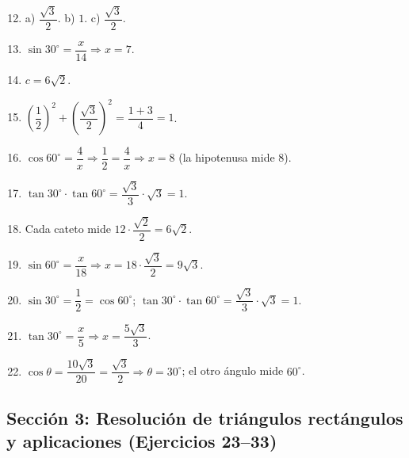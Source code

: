 \documentclass[12pt, letterpaper]{article}
\providecommand{\sen}{\sin}
\begin{document}
  \begin{enumerate}[leftmargin=*, label=\textbf{\arabic*.}]
    \setcounter{enumi}{11}
    \item a) $\dfrac{\sqrt{3}}{2}$. \quad b) $1$. \quad c) $\dfrac{\sqrt{3}}{2}$.
    \item $\sen 30^{\circ} = \dfrac{x}{14} \Rightarrow x = 7$.
    \item $c = 6\sqrt{2}$.
    \item $\left(\dfrac{1}{2}\right)^2 + \left(\dfrac{\sqrt{3}}{2}\right)^2 = \dfrac{1 + 3}{4} = 1$. \checkmark
    \item $\cos 60^{\circ} = \dfrac{4}{x} \Rightarrow \dfrac{1}{2} = \dfrac{4}{x} \Rightarrow x = 8$ (la hipotenusa mide 8).
    \item $\tan 30^{\circ} \cdot \tan 60^{\circ} = \dfrac{\sqrt{3}}{3} \cdot \sqrt{3} = 1$.
    \item Cada cateto mide $12 \cdot \dfrac{\sqrt{2}}{2} = 6\sqrt{2}$.
    \item $\sen 60^{\circ} = \dfrac{x}{18} \Rightarrow x = 18 \cdot \dfrac{\sqrt{3}}{2} = 9\sqrt{3}$.
    \item $\sen 30^{\circ} = \dfrac{1}{2} = \cos 60^{\circ}$; $\tan 30^{\circ} \cdot \tan 60^{\circ} = \dfrac{\sqrt{3}}{3} \cdot \sqrt{3} = 1$. \checkmark
    \item $\tan 30^{\circ} = \dfrac{x}{5} \Rightarrow x = \dfrac{5\sqrt{3}}{3}$.
    \item $\cos \theta = \dfrac{10\sqrt{3}}{20} = \dfrac{\sqrt{3}}{2} \Rightarrow \theta = 30^{\circ}$; el otro ángulo mide $60^{\circ}$.
  \end{enumerate}

  \subsection*{Sección 3: Resolución de triángulos rectángulos y aplicaciones (Ejercicios 23--33)}
\end{document}
